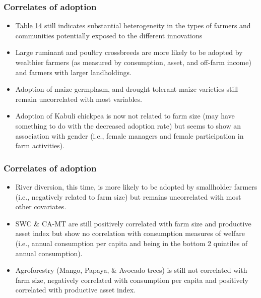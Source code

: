 \documentclass[11pt]{beamer}
\begin{document}
\begin{frame}
\label{scndpg}
\frametitle{Correlates of adoption}
\begin{itemize}
\item \href{https://docs.google.com/spreadsheets/d/1er3FK80X6j2SEQiJfdMl9UpFkFYxEpsF/edit?usp=sharing&ouid=109547849456599033154&rtpof=true&sd=true}{Table 14} still indicates substantial heterogeneity in the types of farmers and communities potentially exposed to the different innovations

\item Large ruminant and poultry crossbreeds are more likely to be adopted by wealthier farmers (as measured by consumption, asset, and off-farm income) and farmers with larger landholdings. \hyperlink{tab14fig1}{}

\item Adoption of maize germplasm, and drought tolerant maize varieties still remain uncorrelated with most variables. 

\item Adoption of Kabuli chickpea is now not related to farm size (may have something to do with the decreased adoption rate) but seems to show an association with gender (i.e., female managers and female participation in farm activities). \hyperlink{tab14fig2}{}

\end{itemize}

\end{frame}


\begin{frame}
\label{thrdpg}
\frametitle{Correlates of adoption}
\begin{itemize}

\item River diversion, this time, is more likely to be adopted by smallholder farmers (i.e., negatively related to farm size) but remains uncorrelated with most other covariates. \hyperlink{tab14fig3}{}

\item SWC \& CA-MT are still positively correlated with farm size and productive asset index but show no correlation with consumption measures of welfare (i.e., annual consumption per capita and being in the bottom 2 quintiles of annual consumption). \hyperlink{tab14fig3}{} 

\item Agroforestry (Mango, Papaya, \& Avocado trees) is still not correlated with farm size, negatively correlated with consumption per capita and positively correlated with productive asset index. \hyperlink{tab14fig3}{}
\end{itemize}

\end{frame}
\end{document}
